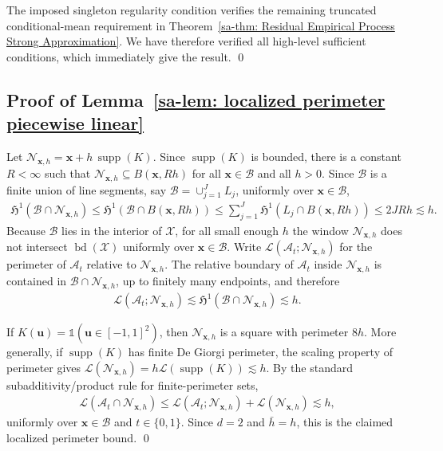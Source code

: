 \documentclass[10pt]{article}
\DeclareMathOperator{\setbd}{bd}
\DeclareMathOperator{\supp}{supp}
\newcommand{\Indicator}{\mathds{1}}
\newcommand{\Haus}{\mathfrak{H}}
\newcommand{\bu}{\mathbf{u}}
\newcommand{\bx}{\mathbf{x}}
\newcommand{\A}{\mathcal{A}}
\newcommand{\B}{\mathcal{B}}
\newcommand{\X}{\mathcal{X}}
\begin{document}
The imposed singleton regularity condition verifies the remaining truncated conditional-mean requirement in Theorem~\ref{sa-thm: Residual Empirical Process Strong Approximation}. We have therefore verified all high-level sufficient conditions, which immediately give the result.
\qed

\subsection{Proof of Lemma~\ref{sa-lem: localized perimeter piecewise linear}}

Let $\mathcal{N}_{\bx,h}=\bx+h\,\supp(K)$. Since $\supp(K)$ is bounded, there is a constant $R<\infty$ such that $\mathcal{N}_{\bx,h}\subseteq B(\bx,Rh)$ for all $\bx\in\B$ and all $h>0$. Since $\B$ is a finite union of line segments, say $\B=\cup_{j=1}^{J}L_j$, uniformly over $\bx\in\B$,
\begin{align*}
    \Haus^1(\B\cap \mathcal{N}_{\bx,h})
    \leq \Haus^1(\B\cap B(\bx,Rh))
    \leq \sum_{j=1}^{J}\Haus^1(L_j\cap B(\bx,Rh))
    \leq 2JRh
    \lesssim h.
\end{align*}
Because $\B$ lies in the interior of $\X$, for all small enough $h$ the window $\mathcal{N}_{\bx,h}$ does not intersect $\setbd(\X)$ uniformly over $\bx\in\B$. Write $\mathcal{L}(\A_t;\mathcal{N}_{\bx,h})$ for the perimeter of $\A_t$ relative to $\mathcal{N}_{\bx,h}$. The relative boundary of $\A_t$ inside $\mathcal{N}_{\bx,h}$ is contained in $\B\cap \mathcal{N}_{\bx,h}$, up to finitely many endpoints, and therefore
\begin{align*}
    \mathcal{L}(\A_t;\mathcal{N}_{\bx,h})\lesssim \Haus^1(\B\cap \mathcal{N}_{\bx,h})\lesssim h.
\end{align*}

If $K(\bu)=\Indicator(\bu\in[-1,1]^2)$, then $\mathcal{N}_{\bx,h}$ is a square with perimeter $8h$. More generally, if $\supp(K)$ has finite De Giorgi perimeter, the scaling property of perimeter gives $\mathcal{L}(\mathcal{N}_{\bx,h})=h\mathcal{L}(\supp(K))\lesssim h$. By the standard subadditivity/product rule for finite-perimeter sets,
\begin{align*}
    \mathcal{L}(\A_t\cap \mathcal{N}_{\bx,h})
    \leq \mathcal{L}(\A_t;\mathcal{N}_{\bx,h})+\mathcal{L}(\mathcal{N}_{\bx,h})
    \lesssim h,
\end{align*}
uniformly over $\bx\in\B$ and $t\in\{0,1\}$. Since $d=2$ and $\bar h=h$, this is the claimed localized perimeter bound. \qed
\end{document}
